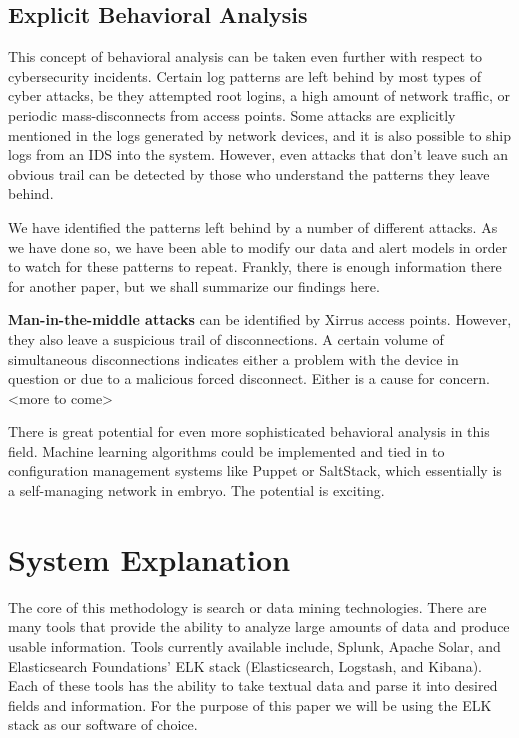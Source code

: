 \documentclass{acm_proc_article-sp}
\begin{document}
\subsection{Explicit Behavioral Analysis}
This concept of behavioral analysis can be taken even further with respect to cybersecurity incidents.  Certain log patterns are left behind by most types of cyber attacks, be they attempted root logins, a high amount of network traffic, or periodic mass-disconnects from access points.  Some attacks are explicitly mentioned in the logs generated by network devices, and it is also possible to ship logs from an IDS into the system.  However, even attacks that don’t leave such an obvious trail can be detected by those who understand the patterns they leave behind.

We have identified the patterns left behind by a number of different attacks.  As we have done so, we have been able to modify our data and alert models in order to watch for these patterns to repeat.  Frankly, there is enough information there for another paper, but we shall summarize our findings here.

\textbf{Man-in-the-middle attacks} can be identified by Xirrus access points.  However, they also leave a suspicious trail of disconnections.  A certain volume of simultaneous disconnections indicates either a problem with the device in question or due to a malicious forced disconnect.  Either is a cause for concern. <more to come>

There is great potential for even more sophisticated behavioral analysis in this field.  Machine learning algorithms could be implemented and tied in to configuration management systems like Puppet or SaltStack, which essentially is a self-managing network in embryo.  The potential is exciting.

\section{System Explanation}
The core of this methodology is search or data mining technologies.  There are many tools that provide the ability to analyze large amounts of data and produce usable information.  Tools currently available include, Splunk, Apache Solar, and Elasticsearch Foundations’ ELK stack (Elasticsearch, Logstash, and Kibana).  Each of these tools has the ability to take textual data and parse it into desired fields and information.  For the purpose of this paper we will be using the ELK stack as our software of choice.
\end{document}
